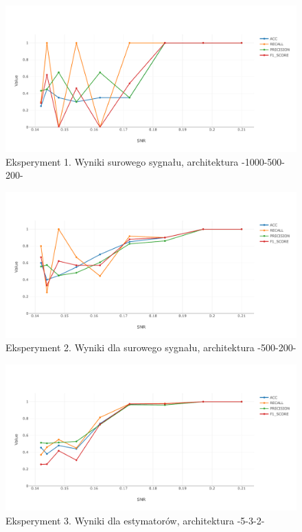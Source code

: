 \documentclass[inzynierska]{pwr_wmat_praca_dyplomowa}
\theoremstyle{plain}
\numberwithin{theorem}{chapter}
\theoremstyle{definition}
\numberwithin{theorem}{chapter}
\begin{document}
\begin{figure}[ht]
	\centering
	\includegraphics[width=14cm]{images/nn_full_1000_500_200.pdf}
	\caption{ Eksperyment 1. Wyniki surowego sygnału, architektura -1000-500-200-}
	\label{wynik-sur-1000-500-200}
\end{figure}

\begin{figure}[ht]
	\centering
	\includegraphics[width=14cm]{images/nn_full_signal_500_200.pdf}
	\caption{Eksperyment 2. Wyniki dla surowego sygnału, architektura -500-200-}
	\label{wynik-sur-500-200}
\end{figure}

\begin{figure}[H]
	\centering
	\includegraphics[width=14cm]{images/snr_to_acc532.pdf}
	\caption{ Eksperyment 3. Wyniki dla estymatorów, architektura -5-3-2-}
	\label{wynik-est-5-3-2}
\end{figure}
\end{document}
